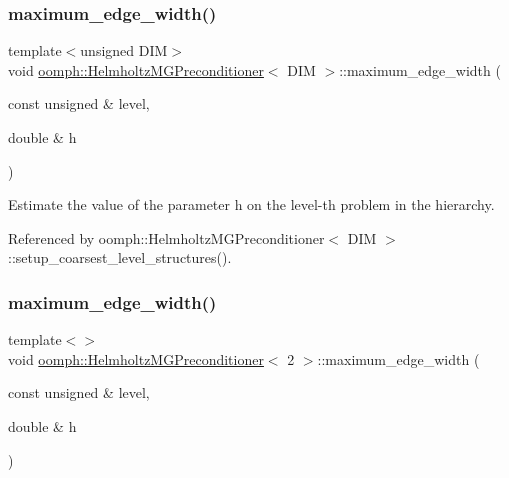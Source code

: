 \mbox{\label{classoomph_1_1HelmholtzMGPreconditioner_aaf65774e7e6c81e4960fcb451e7434e6}} 
\subsubsection{\texorpdfstring{maximum\+\_\+edge\+\_\+width()}{maximum\_edge\_width()}\hspace{0.1cm}{\footnotesize\ttfamily [1/3]}}
{\footnotesize\ttfamily template$<$unsigned D\+IM$>$ \\
void \hyperlink{classoomph_1_1HelmholtzMGPreconditioner}{oomph\+::\+Helmholtz\+M\+G\+Preconditioner}$<$ D\+IM $>$\+::maximum\+\_\+edge\+\_\+width (\begin{DoxyParamCaption}\item[{const unsigned \&}]{level,  }\item[{double \&}]{h }\end{DoxyParamCaption})\hspace{0.3cm}{\ttfamily [private]}}



Estimate the value of the parameter h on the level-\/th problem in the hierarchy. 



Referenced by oomph\+::\+Helmholtz\+M\+G\+Preconditioner$<$ D\+I\+M $>$\+::setup\+\_\+coarsest\+\_\+level\+\_\+structures().

\mbox{\label{classoomph_1_1HelmholtzMGPreconditioner_a6d82759a65c164c8ee020ea141c5d89e}} 
\subsubsection{\texorpdfstring{maximum\+\_\+edge\+\_\+width()}{maximum\_edge\_width()}\hspace{0.1cm}{\footnotesize\ttfamily [2/3]}}
{\footnotesize\ttfamily template$<$$>$ \\
void \hyperlink{classoomph_1_1HelmholtzMGPreconditioner}{oomph\+::\+Helmholtz\+M\+G\+Preconditioner}$<$ 2 $>$\+::maximum\+\_\+edge\+\_\+width (\begin{DoxyParamCaption}\item[{const unsigned \&}]{level,  }\item[{double \&}]{h }\end{DoxyParamCaption})\hspace{0.3cm}{\ttfamily [private]}}



